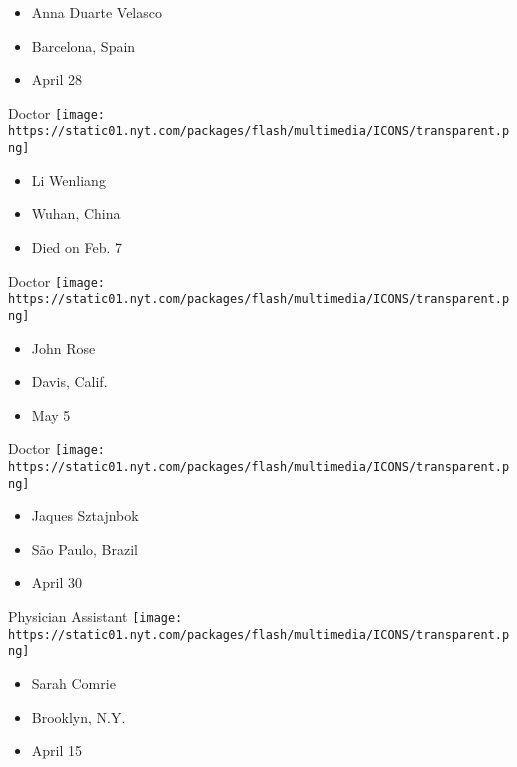 \begin{itemize}
\tightlist
\item
  Anna Duarte Velasco
\item
  Barcelona, Spain
\item
  April 28
\end{itemize}

\protect\hyperlink{item-li-wenliang}{}

Doctor
\texttt{[image: https://static01.nyt.com/packages/flash/multimedia/ICONS/transparent.png]}

\begin{itemize}
\tightlist
\item
  Li Wenliang
\item
  Wuhan, China
\item
  Died on Feb. 7
\end{itemize}

\protect\hyperlink{item-john-rose}{}

Doctor
\texttt{[image: https://static01.nyt.com/packages/flash/multimedia/ICONS/transparent.png]}

\begin{itemize}
\tightlist
\item
  John Rose
\item
  Davis, Calif.
\item
  May 5
\end{itemize}

\protect\hyperlink{item-jaques-sztajnbok}{}

Doctor
\texttt{[image: https://static01.nyt.com/packages/flash/multimedia/ICONS/transparent.png]}

\begin{itemize}
\tightlist
\item
  Jaques Sztajnbok
\item
  São Paulo, Brazil
\item
  April 30
\end{itemize}

\protect\hyperlink{item-sarah-comrie}{}

Physician Assistant
\texttt{[image: https://static01.nyt.com/packages/flash/multimedia/ICONS/transparent.png]}

\begin{itemize}
\tightlist
\item
  Sarah Comrie
\item
  Brooklyn, N.Y.
\item
  April 15
\end{itemize}


